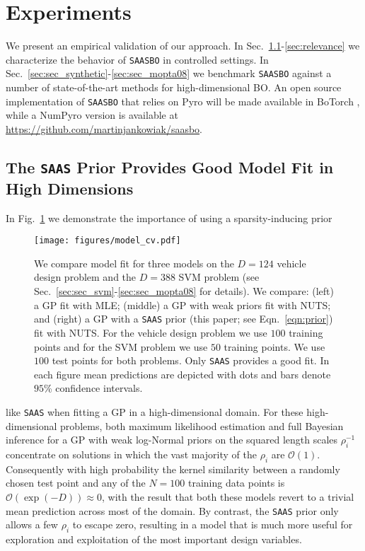 \documentclass[accepted]{uai2021} %
\newcommand{\algoname}{{\texttt {SAASBO}}}
\newcommand{\priorname}{{\texttt {SAAS}}}
\newcommand{\OO}{\mathcal{O}}
\begin{document}
\section{Experiments}
\label{sec:exp}
We present an empirical validation of our approach.
In Sec.~\ref{sec:fit}-\ref{sec:relevance} we characterize the behavior of \algoname{} in controlled settings.
In Sec.~\ref{sec:sec_synthetic}-\ref{sec:sec_mopta08} we benchmark \algoname{} against a number of state-of-the-art methods for high-dimensional BO.
An open source implementation of \algoname{} that relies on Pyro \citep{bingham2019pyro} will be made
available in BoTorch \citep{balandat2019botorch}, while a NumPyro \citep{phan2019composable} version is available at \url{https://github.com/martinjankowiak/saasbo}.

\subsection{The \priorname{} Prior Provides Good Model Fit in High Dimensions}
\label{sec:fit}

In Fig.~\ref{fig:model_cv} we demonstrate the importance of using a sparsity-inducing prior
\begin{figure}[!ht]
    \texttt{[image: figures/model\_cv.pdf]}
    \caption{
      We compare model fit for three models on the $D=124$ vehicle design problem and the $D=388$ SVM problem
      (see Sec.~\ref{sec:sec_svm}-\ref{sec:sec_mopta08} for details).
    We compare:
    (left) a GP fit with MLE;
    (middle) a GP with weak priors fit with NUTS;
    and (right) a GP with a \priorname{} prior (this paper; see Eqn.~\eqref{eqn:prior}) fit with NUTS.
    For the vehicle design problem we use $100$ training points and for the SVM problem we use $50$ training points.
    We use $100$ test points for both problems.
    Only \priorname{} provides a good fit.
    In each figure mean predictions are depicted with dots and bars denote $95$\% confidence intervals.
    }
    \label{fig:model_cv}
\end{figure}
like \priorname{} when fitting a GP in a high-dimensional domain.
For these high-dimensional problems, both maximum likelihood
estimation and full Bayesian inference for a GP with weak log-Normal
priors on the squared length scales $\rho_i^{-1}$ concentrate on
solutions in which the vast majority of the $\rho_i$ are $\OO(1)$. Consequently
with high probability the kernel similarity between a randomly chosen test point and any of the
$N=100$ training data points is $\OO (\exp(-D)) \approx 0$, with the result that both
these models revert to a trivial mean prediction across most of the domain.
By contrast, the \priorname{} prior only allows a few $\rho_i$ to escape zero, resulting
in a model that is much more useful for exploration and exploitation of the most important design variables.
\end{document}
